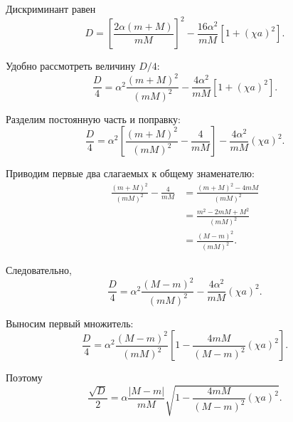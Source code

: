 \documentclass[../final.tex]{subfiles}
\begin{document}
Дискриминант равен
%
\begin{equation*}
    D
    =
    \left[
        \frac{2\alpha(m+M)}{mM}
    \right]^2
    -
    \frac{16\alpha^2}{mM}
    \left[
        1+(\chi a)^2
    \right].
\end{equation*}
%

Удобно рассмотреть величину $D/4$:
%
\begin{equation*}
    \frac{D}{4}
    =
    \alpha^2
    \frac{(m+M)^2}{(mM)^2}
    -
    \frac{4\alpha^2}{mM}
    \left[
        1+(\chi a)^2
    \right].
\end{equation*}
%

Разделим постоянную часть и поправку:
%
\begin{equation*}
    \frac{D}{4}
    =
    \alpha^2
    \left[
        \frac{(m+M)^2}{(mM)^2}
        -
        \frac{4}{mM}
    \right]
    -
    \frac{4\alpha^2}{mM}
    (\chi a)^2.
\end{equation*}
%

Приводим первые два слагаемых к общему знаменателю:
%
\begin{align*}
    \frac{(m+M)^2}{(mM)^2}
    -
    \frac{4}{mM}
    &=
    \frac{
        (m+M)^2-4mM
    }{
        (mM)^2
    }
    \\
    &=
    \frac{
        m^2-2mM+M^2
    }{
        (mM)^2
    }
    \\
    &=
    \frac{
        (M-m)^2
    }{
        (mM)^2
    }.
\end{align*}
%

Следовательно,
%
\begin{equation*}
    \frac{D}{4}
    =
    \alpha^2
    \frac{(M-m)^2}{(mM)^2}
    -
    \frac{4\alpha^2}{mM}
    (\chi a)^2.
\end{equation*}
%

Выносим первый множитель:
%
\begin{equation*}
    \frac{D}{4}
    =
    \alpha^2
    \frac{(M-m)^2}{(mM)^2}
    \left[
        1
        -
        \frac{4mM}{(M-m)^2}
        (\chi a)^2
    \right].
\end{equation*}
%

Поэтому
%
\begin{equation*}
    \frac{\sqrt D}{2}
    =
    \alpha
    \frac{|M-m|}{mM}
    \sqrt{
        1
        -
        \frac{4mM}{(M-m)^2}
        (\chi a)^2
    }.
\end{equation*}


\end{document}

